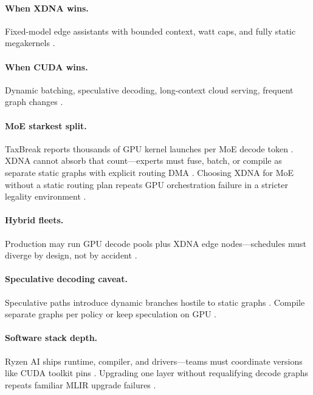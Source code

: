 \paragraph{When XDNA wins.}
Fixed-model edge assistants with bounded context, watt caps, and fully static megakernels \citep{amd2024xdna,yirage2026,dao2022flashattention}.

\paragraph{When CUDA wins.}
Dynamic batching, speculative decoding, long-context cloud serving, frequent graph changes \citep{kwon2023vllm,nvidia2024cudagraphs,taxbreak2026,liu2024deepseekv3}.

\paragraph{MoE starkest split.}
TaxBreak reports thousands of GPU kernel launches per MoE decode token \citep{taxbreak2026,liu2024deepseekv3}.
XDNA cannot absorb that count---experts must fuse, batch, or compile as separate static graphs with explicit routing DMA \citep{yirage2026,amd2024aie}.
Choosing XDNA for MoE without a static routing plan repeats GPU orchestration failure in a stricter legality environment \citep{patel2025llminference,memoryfloor2026}.

\paragraph{Hybrid fleets.}
Production may run GPU decode pools plus XDNA edge nodes---schedules must diverge by design, not by accident \citep{patel2025llminference,liu2024deepseekv3,amd2024xdna,yirage2026}.

\paragraph{Speculative decoding caveat.}
Speculative paths introduce dynamic branches hostile to static graphs \citep{patel2025llminference,liu2024deepseekv3}.
Compile separate graphs per policy or keep speculation on GPU \citep{yirage2026,amd2024xdna}.

\paragraph{Software stack depth.}
Ryzen AI ships runtime, compiler, and drivers---teams must coordinate versions like CUDA toolkit pins \citep{amd2024aie,amd2024xdna,chen2020compilerbasedhardw}.
Upgrading one layer without requalifying decode graphs repeats familiar MLIR upgrade failures \citep{yirage2026,taxbreak2026,memoryfloor2026}.

